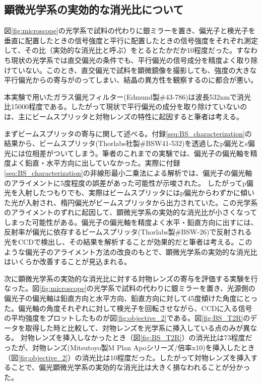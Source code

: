 \subsection{顕微光学系の実効的な消光比について}
図\ref{fig:microscope}の光学系で試料の代わりに銀ミラーを置き、偏光子と検光子を垂直に配置したときの信号強度と平行に配置したときの信号強度をそれぞれ測定して、その比（実効的な消光比と呼ぶ）をとるとたかだか10程度だった。すなわち現状の光学系では直交偏光の条件でも、平行偏光の信号成分を精度よく取り除けていない。このとき、直交偏光で試料を顕微鏡像を撮影しても、強度の大きな平行偏光からの寄与がのってしまい、結晶の異方性を観察するのに都合が悪い。

本実験で用いたガラス偏光フィルター(Edmund製\#43-786)は波長532nmで消光比15000程度である。したがって現状で平行偏光の成分を取り除けていないのは、主にビームスプリッタと対物レンズの特性に起因すると筆者は考える。

まずビームスプリッタの寄与に関して述べる。付録\ref{seq:BS_characterization}の結果から、ビームスプリッタ(Thorlabs社製\#BSW41-532)を透過したp偏光とs偏光には位相差がついてしまう。筆者のこれまでの実験では、偏光子の偏光軸を精度よく鉛直・水平方向に出していなかった。実際に付録\ref{seq:BS_characterization}の非線形最小二乗法による解析では、偏光子の偏光軸のアライメントに5度程度の誤差があった可能性が示唆された。 したがってp偏光を入射したつもりでも、実際はビームスプリッタにはp偏光からわずかに傾いた光が入射され、楕円偏光がビームスプリッタから出力されていた。この光学系のアライメントのずれに起因して、顕微光学系の実効的な消光比が小さくなってしまった可能性がある。偏光子の偏光軸を精度よく水平・鉛直方向に出すには、反射率が偏光に依存するビームスプリッタ(Thorlabs製\#BSW-26)で反射される光をCCDで検出し、その結果を解析することが効果的だと筆者は考える。このような偏光子のアライメント方法の改良のもとで、顕微光学系の実効的な消光比はいくらか改善することが見込まれる。

次に顕微光学系の実効的な消光比に対する対物レンズの寄与を評価する実験を行なった。図\ref{fig:microscope}の光学系で試料の代わりに銀ミラーを置き、光源側の偏光子の偏光軸は鉛直方向と水平方向、鉛直方向に対して45度傾けた角度にとった。偏光軸の角度それぞれに対して検光子を回転させながら、CCDに入る信号の平均強度をプロットしたものが図\ref{fig:objective_2}である。図\ref{fig:BS_T2R}のデータを取得した時と比較して、対物レンズを光学系に挿入している点のみが異なる。
対物レンズを挿入しなかったとき（図\ref{fig:BS_T2R}）の消光比は73程度だったが、対物レンズ(Mitsutoyo製M Plan Apoシリーズ/倍率x10)を挿入したとき（図\ref{fig:objective_2}）の消光比は10程度だった。したがって対物レンズを挿入することで、偏光顕微光学系の実効的な消光比は大きく損なわれることが分かった。

